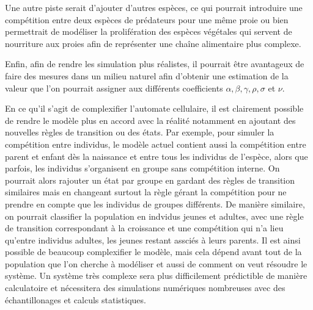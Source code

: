 Une autre piste serait d'ajouter d'autres espèces, ce qui pourrait introduire une compétition entre deux espèces de prédateurs pour une même proie ou bien permettrait de modéliser la prolifération des espèces végétales qui servent de nourriture aux proies afin de représenter une chaîne alimentaire plus complexe.

\vspace{0.3cm}
Enfin, afin de rendre les simulation plus réalistes, il pourrait être avantageux de faire des mesures dans un milieu naturel afin d'obtenir une estimation de la valeur que l'on pourrait assigner aux différents coefficients $\alpha, \beta, \gamma, \rho, \sigma$ et $\nu$.

\vspace{0.3cm}
En ce qu'il s'agit de complexifier l'automate cellulaire, il est clairement possible de rendre le modèle plus en accord avec la réalité notamment en ajoutant des nouvelles règles de transition ou des états. 
Par exemple, pour simuler la compétition entre individus, le modèle actuel contient aussi la compétition entre parent et enfant dès la naissance et entre tous les individus de l'espèce, alors que parfois, les individus s'organisent en groupe sans compétition interne. On pourrait alors rajouter un état par groupe en gardant des règles de transition similaires mais en changeant surtout la règle gérant la compétition pour ne prendre en compte que les individus de groupes différents. 
De manière similaire, on pourrait classifier la population en indvidus jeunes et adultes, avec une règle de transition correspondant à la croissance et une compétition qui n'a lieu qu'entre individus adultes, les jeunes restant assciés à leurs parents. 
Il est ainsi possible de beaucoup complexifier le modèle, mais cela dépend avant tout de la population que l'on cherche à modéliser et aussi de comment on veut résoudre le système. Un système très complexe sera plus difficilement prédictible de manière calculatoire et nécessitera des simulations numériques nombreuses avec des échantillonages et calculs statistiques.
